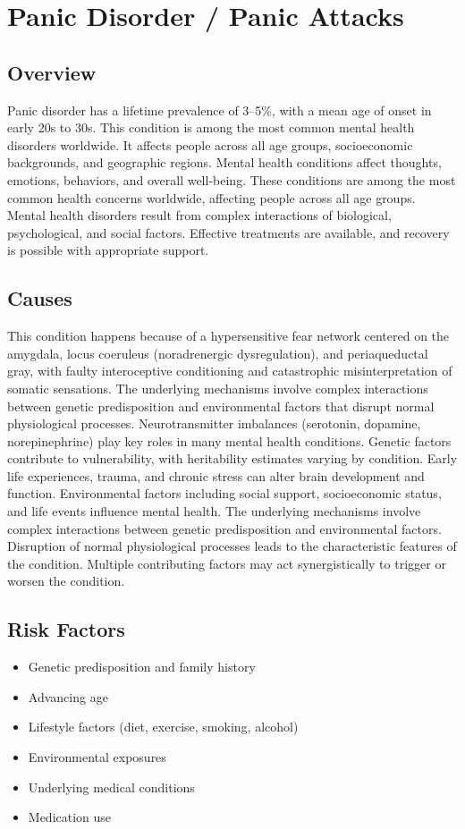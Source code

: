 \chapter{Panic Disorder / Panic Attacks}
\label{sec:Panic Disorder / Panic Attacks}

\section{Overview}
Panic disorder has a lifetime prevalence of 3--5\%, with a mean age of onset in early 20s to 30s. This condition is among the most common mental health disorders worldwide. It affects people across all age groups, socioeconomic backgrounds, and geographic regions. Mental health conditions affect thoughts, emotions, behaviors, and overall well-being. These conditions are among the most common health concerns worldwide, affecting people across all age groups. Mental health disorders result from complex interactions of biological, psychological, and social factors. Effective treatments are available, and recovery is possible with appropriate support.
\section{Causes}
This condition happens because of a hypersensitive fear network centered on the amygdala, locus coeruleus (noradrenergic dysregulation), and periaqueductal gray, with faulty interoceptive conditioning and catastrophic misinterpretation of somatic sensations. The underlying mechanisms involve complex interactions between genetic predisposition and environmental factors that disrupt normal physiological processes. Neurotransmitter imbalances (serotonin, dopamine, norepinephrine) play key roles in many mental health conditions. Genetic factors contribute to vulnerability, with heritability estimates varying by condition. Early life experiences, trauma, and chronic stress can alter brain development and function. Environmental factors including social support, socioeconomic status, and life events influence mental health. The underlying mechanisms involve complex interactions between genetic predisposition and environmental factors. Disruption of normal physiological processes leads to the characteristic features of the condition. Multiple contributing factors may act synergistically to trigger or worsen the condition.
\section{Risk Factors}
\begin{itemize}[noitemsep]
  \item Genetic predisposition and family history
  \item Advancing age
  \item Lifestyle factors (diet, exercise, smoking, alcohol)
  \item Environmental exposures
  \item Underlying medical conditions
  \item Medication use
\end{itemize}
